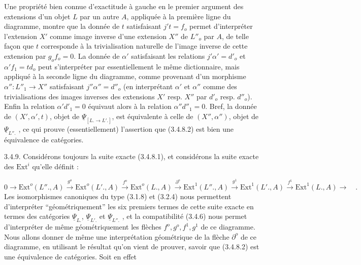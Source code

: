 Une propriété bien connue d'exactitude à gauche en le premier argument des extensions d'un objet $L$ par un autre $A$, appliquée à la première ligne du diagramme, montre que la donnée de $t$ satisfaisant $j't = f_o$ permet d'interpréter l'extension $X'$ comme image inverse d'une extension $X''$ de $L''_o$ par $A$, de telle façon que $t$ corresponde à la trivialisation naturelle de l'image inverse de cette extension par $g_o f_o = 0$. La donnée de $\alpha'$ satisfaisant les relations $j'\alpha' = d'_o$ et $\alpha'f_1 = td_o$ peut s'interpréter par essentiellement le même dictionnaire, mais appliqué à la seconde ligne du diagramme, comme provenant d'un morphisme $\alpha'' : L''_1 \longrightarrow X''$ satisfaisant $j''\alpha'' = d''_o$ (en interprétant $\alpha'$ et $\alpha''$ comme des trivialisations des images inverses des extensions $X'$ resp. $X''$ par $d'_o$ resp. $d''_o$). Enfin la relation $\alpha'd'_1 = 0$ équivaut alors à la relation $\alpha''d''_1 = 0$. Bref, la donnée de $(X',\alpha',t)$, objet de $\underline{\Psi}_{[L. \longrightarrow L'.]}$, est équivalente à celle de $(X'',\alpha'')$, objet de $\underline{\Psi}_{L''.}$ , ce qui prouve (essentiellement) l'assertion que (3.4.8.2) est bien une équivalence de catégories.

3.4.9. Considérons toujours la suite exacte (3.4.8.1), et considérons la suite exacte des $\mathrm{Ext}^i$ qu'elle définit :

{\footnotesize \begin{equation}\tag{3.4.9.1}
0 \longrightarrow \mathrm{Ext}^o(L''.,A) \stackrel{g^o}{\longrightarrow} \mathrm{Ext}^o(L'.,A) \stackrel{f^o}{\longrightarrow} \mathrm{Ext}^o(L.,A) \stackrel{\partial^o}{\longrightarrow} \mathrm{Ext}^1(L''.,A) \stackrel{g^1}{\longrightarrow} \mathrm{Ext}^1(L'.,A) \stackrel{f^1}{\longrightarrow} \mathrm{Ext}^1(L.,A) \longrightarrow \quad .
\end{equation}}
Les isomorphismes canoniques du type (3.1.8) et (3.2.4) nous permettent d'interpréter ``géométriquement'' les six premiers termes de cette suite exacte en termes des catégories $\underline{\Psi}_{L.}$, $\underline{\Psi}_{L'.}$ et $\underline{\Psi}_{L''.}$ , et la compatibilité (3.4.6) nous permet d'interpréter de même géométriquement les flèches
$f^o,g^o,f^1,g^1$ de ce diagramme. Nous allons donner de même une interprétation géométrique de la flèche $\partial^o$ de ce diagramme, en utilisant le résultat qu'on vient de prouver, savoir que (3.4.8.2) est une équivalence de catégories. Soit en effet

